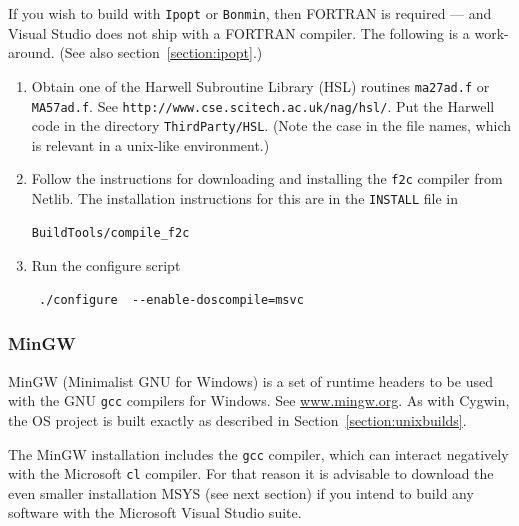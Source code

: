 \documentclass[11pt]{article}
\renewcommand{\_}{{\char"5F}}
\renewcommand{\{}{{\char"7B}}
\renewcommand{\}}{{\char"7D}}
\renewcommand{\^}{{\char"0D}}
\renewcommand{\'}{{\char"0D}}
\newcommand{\UrlHsl}{http://www.cse.scitech.ac.uk/nag/hsl/}
\begin{document}
\begin{enumerate}[Step 1:]
If you wish to build with {\tt Ipopt} or {\tt Bonmin}, then FORTRAN is required --- and Visual Studio does not ship with a FORTRAN compiler.
The following is a work-around. (See also section~\ref{section:ipopt}.)

\begin{enumerate}[Step a.]

\item{}  Obtain one of the   Harwell Subroutine Library (HSL) routines
{\tt ma27ad.f} or {\tt MA57ad.f}. See {\tt\UrlHsl}.  Put the Harwell code in the
directory {\tt ThirdParty/HSL}. (Note the case in the file names, which is relevant in a unix-like environment.)




\item{}  Follow the instructions for downloading and installing the {\tt f2c} compiler from Netlib.
The installation instructions for this are in the {\tt INSTALL} file in
\begin{verbatim}
BuildTools/compile_f2c
\end{verbatim}



\item{}  Run the configure script

\begin{verbatim}
 ./configure  --enable-doscompile=msvc
\end{verbatim}


\end{enumerate}


\end{enumerate}



\subsubsection{MinGW} \label{section:mingw}


MinGW (Minimalist GNU for Windows) is a set of runtime headers to be used with the GNU {\tt gcc} compilers for Windows.
See \url{www.mingw.org}. As with Cygwin, the OS project is  built exactly as described in Section~\ref{section:unixbuilds}.

The MinGW installation includes the {\tt gcc} compiler, which can interact negatively with the Microsoft {\tt cl} compiler.
For that reason it is advisable to download the even smaller installation MSYS (see next section) if you intend to
build any software with the Microsoft Visual Studio suite.
\end{document}
